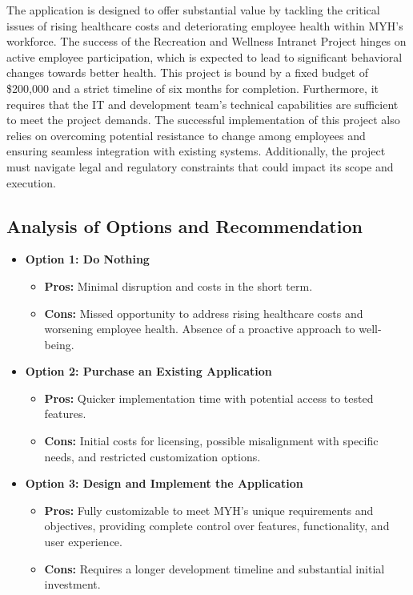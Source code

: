 The application is designed to offer substantial value by tackling the critical issues of rising healthcare costs and deteriorating employee health within MYH's workforce. The success of the Recreation and Wellness Intranet Project hinges on active employee participation, which is expected to lead to significant behavioral changes towards better health. This project is bound by a fixed budget of \$200,000 and a strict timeline of six months for completion. Furthermore, it requires that the IT and development team's technical capabilities are sufficient to meet the project demands. The successful implementation of this project also relies on overcoming potential resistance to change among employees and ensuring seamless integration with existing systems. Additionally, the project must navigate legal and regulatory constraints that could impact its scope and execution.


\subsection{Analysis of Options and Recommendation}

\begin{itemize}
    \item \textbf{Option 1: Do Nothing}
    \begin{itemize}
        \item \textbf{Pros:} Minimal disruption and costs in the short term.
        \item \textbf{Cons:} Missed opportunity to address rising healthcare costs and worsening employee health. Absence of a proactive approach to well-being.
    \end{itemize}
    
    \item \textbf{Option 2: Purchase an Existing Application}
    \begin{itemize}
        \item \textbf{Pros:} Quicker implementation time with potential access to tested features.
        \item \textbf{Cons:} Initial costs for licensing, possible misalignment with specific needs, and restricted customization options.
    \end{itemize}
    
    \item \textbf{Option 3: Design and Implement the Application}
    \begin{itemize}
        \item \textbf{Pros:} Fully customizable to meet MYH's unique requirements and objectives, providing complete control over features, functionality, and user experience.
        \item \textbf{Cons:} Requires a longer development timeline and substantial initial investment.
    \end{itemize}
\end{itemize}

